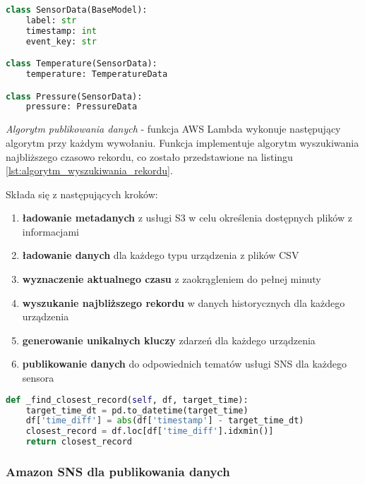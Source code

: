 \begin{lstlisting}[language=Python, caption=Klasy modeli danych, label={lst:klasy_modeli_danych}]
class SensorData(BaseModel):
    label: str
    timestamp: int
    event_key: str

class Temperature(SensorData):
    temperature: TemperatureData

class Pressure(SensorData):
    pressure: PressureData
\end{lstlisting}

\textit{Algorytm publikowania danych} - funkcja AWS Lambda wykonuje następujący algorytm przy każdym wywołaniu. Funkcja implementuje algorytm wyszukiwania najbliższego czasowo rekordu, co zostało przedstawione na listingu \ref{lst:algorytm_wyszukiwania_rekordu}. 

\vspace{0.3em}

Składa się z następujących kroków:

\begin{enumerate}
    \item \textbf{ładowanie metadanych} z usługi S3 w celu określenia dostępnych plików z informacjami
    \item \textbf{ładowanie danych} dla każdego typu urządzenia z plików CSV
    \item \textbf{wyznaczenie aktualnego czasu} z zaokrągleniem do pełnej minuty
    \item \textbf{wyszukanie najbliższego rekordu} w danych historycznych dla każdego urządzenia
    \item \textbf{generowanie unikalnych kluczy} zdarzeń dla każdego urządzenia
    \item \textbf{publikowanie danych} do odpowiednich tematów usługi SNS dla każdego sensora
\end{enumerate}

\vspace{0.3em}

\begin{lstlisting}[language=Python, caption=Algorytm wyszukiwania najbliższego rekordu, label={lst:algorytm_wyszukiwania_rekordu}]
def _find_closest_record(self, df, target_time):
    target_time_dt = pd.to_datetime(target_time)
    df['time_diff'] = abs(df['timestamp'] - target_time_dt)
    closest_record = df.loc[df['time_diff'].idxmin()]
    return closest_record
\end{lstlisting}

\subsubsection{Amazon SNS dla publikowania danych}
\label{subsec:amazon_sns}

